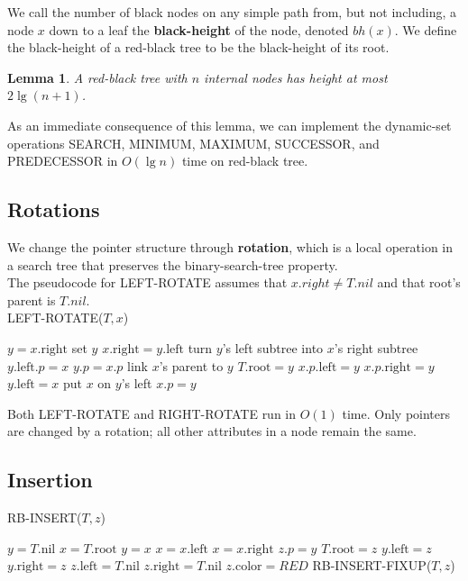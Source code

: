 \documentclass[12pt]{article}
\newtheorem{lemma}[theorem]{Lemma}
\begin{document}
We call the number of black nodes on any simple path from, but not including, a node $x$ down to a leaf the \textbf {black-height} of the node, denoted $bh(x)$. We define the black-height of a red-black tree to be the black-height of its root.

\begin{lemma}
  A red-black tree with $n$ internal nodes has height at most $2 \lg (n+1)$.
\end{lemma}

As an immediate consequence of this lemma, we can implement the dynamic-set operations SEARCH, MINIMUM, MAXIMUM, SUCCESSOR, and PREDECESSOR in $O(\lg n)$ time on red-black tree.

\subsection{Rotations}

We change the pointer structure through \textbf {rotation}, which is a local operation in a search tree that preserves the binary-search-tree property. \\

The pseudocode for LEFT-ROTATE assumes that $x.right \neq T.nil$ and that root's parent is $T.nil$. \\

LEFT-ROTATE($T,x$)
\begin{algorithmic}[1]
\State $y = x.\text{right}$
\Comment set $y$
\State $x.\text{right} = y.\text{left}$
\Comment turn $y$'s left subtree into $x$'s right subtree
	\State $y.\text{left}.p = x$
\EndIf
\State $y.p = x.p$
\Comment link $x$'s parent to $y$
	\State $T.\text{root} = y$
	\State $x.p.\text{left} = y$
\Else
	\State $x.p.\text{right} = y$
\EndIf
\State $y.\text{left} = x$
\Comment put $x$ on $y$'s left
\State $x.p = y$
\end{algorithmic}

Both LEFT-ROTATE and RIGHT-ROTATE run in $O(1)$ time. Only pointers are changed by a rotation; all other attributes in a node remain the same.

\subsection{Insertion}

RB-INSERT($T,z$)
\begin{algorithmic}[1]
\State $y = T.\text{nil}$
\State $x = T.\text{root}$
	\State $y = x$
        	\State $x = x.\text{left}$
        \Else
        	\State $x = x.\text{right}$
        \EndIf
\EndWhile
\State $z.p = y$
	\State $T.\text{root} = z$
	\State $y.\text{left} = z$
\Else
	\State $y.\text{right} = z$
\EndIf
\State $z.\text{left} = T.\text{nil}$
\State $z.\text{right} = T.\text{nil}$
\State $z.\text{color} = RED$
\State RB-INSERT-FIXUP($T,z$)
\end{algorithmic}
\end{document}
